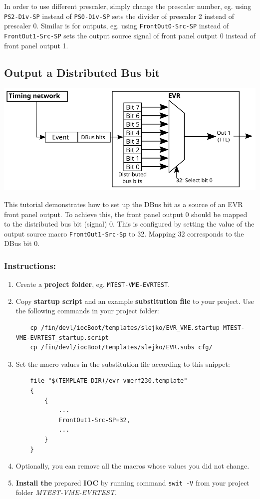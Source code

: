 \documentclass[12pt,a4paper]{article}
\begin{document}
In order to use different prescaler, simply change the prescaler number, eg. using \texttt{PS2-Div-SP} instead of \texttt{PS0-Div-SP} sets the divider of prescaler 2 instead of prescaler 0.
Similar is for outputs, eg. using \texttt{FrontOut0-Src-SP} instead of \texttt{FrontOut1-Src-SP} sets the output source signal of front panel output 0 instead of front panel output 1.

\subsection{Output a Distributed Bus bit}
	\includegraphics[]{./img/dbus}
	
This tutorial demonstrates how to set up the DBus bit as a source of an EVR front panel output. To achieve this, the front panel output 0 should be mapped to the distributed bus bit (signal) 0. This is configured by setting the value of the output source macro \texttt{FrontOut1-Src-Sp} to 32. Mapping 32 corresponds to the DBus bit 0.

\subsubsection{Instructions:}
\begin{enumerate}
	\item Create a \textbf{project folder}, eg. \texttt{MTEST-VME-EVRTEST}.
	\item Copy \textbf{startup script} and an example \textbf{substitution file} to your project. Use the following commands in your project folder:
\begin{lstlisting}
	cp /fin/devl/iocBoot/templates/slejko/EVR_VME.startup MTEST-VME-EVRTEST_startup.script
	cp /fin/devl/iocBoot/templates/slejko/EVR.subs cfg/
\end{lstlisting}

	\item Set the macro values in the substitution file according to this snippet:
\begin{lstlisting}
	file "$(TEMPLATE_DIR)/evr-vmerf230.template"
	{
		{
			...
			FrontOut1-Src-SP=32,
			...
		}
	}
\end{lstlisting}

	\item Optionally, you can remove all the macros whose values you did not change. 
	\item \textbf{Install the} prepared \textbf{IOC} by running command \texttt{swit -V} from your project folder \textit{MTEST-VME-EVRTEST}.
\end{enumerate}
\end{document}
